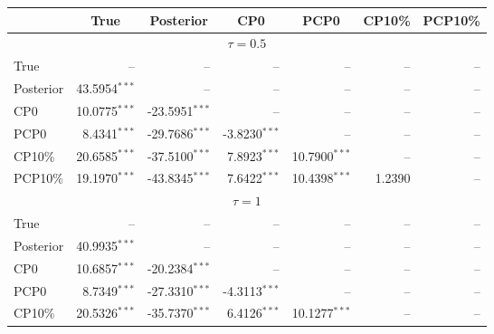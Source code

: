 { \renewcommand{\arraystretch}{1.2} 
 {\footnotesize 
\begin{table} 
\center 
\begin{tabular}{l | rrrrrr} 
& \multicolumn{1}{c}{True}& \multicolumn{1}{c}{Posterior}& \multicolumn{1}{c}{CP0}& \multicolumn{1}{c}{PCP0}& \multicolumn{1}{c}{CP10\%}& \multicolumn{1}{c}{PCP10\%} \\ \hline 
\multicolumn{7}{c}{$\tau = 0.5$} \\ \hline 
True &    --\phantom{$^{***}$} &    --\phantom{$^{***}$} &    --\phantom{$^{***}$} &    --\phantom{$^{***}$} &    --\phantom{$^{***}$} &    --\phantom{$^{***}$}   \\ 
Posterior & 43.5954$^{***}$ &    --\phantom{$^{***}$} &    --\phantom{$^{***}$} &    --\phantom{$^{***}$} &    --\phantom{$^{***}$} &    --\phantom{$^{***}$}   \\ 
CP0 & 10.0775$^{***}$ & -23.5951$^{***}$ &    --\phantom{$^{***}$} &    --\phantom{$^{***}$} &    --\phantom{$^{***}$} &    --\phantom{$^{***}$}   \\ 
PCP0 & 8.4341$^{***}$ & -29.7686$^{***}$ & -3.8230$^{***}$ &    --\phantom{$^{***}$} &    --\phantom{$^{***}$} &    --\phantom{$^{***}$}   \\ 
CP10\% & 20.6585$^{***}$ & -37.5100$^{***}$ & 7.8923$^{***}$ & 10.7900$^{***}$ &    --\phantom{$^{***}$} &    --\phantom{$^{***}$}   \\ 
PCP10\% & 19.1970$^{***}$ & -43.8345$^{***}$ & 7.6422$^{***}$ & 10.4398$^{***}$ & 1.2390\phantom{$^{***}$} &    --\phantom{$^{***}$}   \\ 
\hline 
\multicolumn{7}{c}{$\tau = 1$} \\ \hline 
True &    --\phantom{$^{***}$} &    --\phantom{$^{***}$} &    --\phantom{$^{***}$} &    --\phantom{$^{***}$} &    --\phantom{$^{***}$} &    --\phantom{$^{***}$}   \\ 
Posterior & 40.9935$^{***}$ &    --\phantom{$^{***}$} &    --\phantom{$^{***}$} &    --\phantom{$^{***}$} &    --\phantom{$^{***}$} &    --\phantom{$^{***}$}   \\ 
CP0 & 10.6857$^{***}$ & -20.2384$^{***}$ &    --\phantom{$^{***}$} &    --\phantom{$^{***}$} &    --\phantom{$^{***}$} &    --\phantom{$^{***}$}   \\ 
PCP0 & 8.7349$^{***}$ & -27.3310$^{***}$ & -4.3113$^{***}$ &    --\phantom{$^{***}$} &    --\phantom{$^{***}$} &    --\phantom{$^{***}$}   \\ 
CP10\% & 20.5326$^{***}$ & -35.7370$^{***}$ & 6.4126$^{***}$ & 10.1277$^{***}$ &    --\phantom{$^{***}$} &    --\phantom{$^{***}$}   \\ 

\end{tabular}
\end{table}}}
